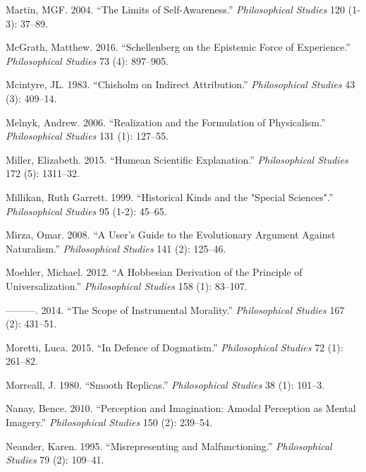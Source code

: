 \documentclass[
  10pt,
  letterpaper,
  DIV=11,
  numbers=noendperiod,
  twoside]{scrartcl}
\newlength{\cslhangindent}
\newenvironment{CSLReferences}[2] %
 {\begin{list}{}{%
  \setlength{\itemindent}{0pt}
  \setlength{\leftmargin}{0pt}
  \setlength{\parsep}{0pt}
  \ifodd #1
   \setlength{\leftmargin}{\cslhangindent}
   \setlength{\itemindent}{-1\cslhangindent}
  \fi
  \setlength{\itemsep}{#2\baselineskip}}}
 {\end{list}}
\begin{document}
\begin{CSLReferences}{1}{0}
Martin, MGF. 2004. {``The Limits of Self-Awareness.''}
\emph{Philosophical Studies} 120 (1-3): 37--89.

McGrath, Matthew. 2016. {``Schellenberg on the Epistemic Force of
Experience.''} \emph{Philosophical Studies} 73 (4): 897--905.

Mcintyre, JL. 1983. {``Chisholm on Indirect Attribution.''}
\emph{Philosophical Studies} 43 (3): 409--14.

Melnyk, Andrew. 2006. {``Realization and the Formulation of
Physicalism.''} \emph{Philosophical Studies} 131 (1): 127--55.

Miller, Elizabeth. 2015. {``Humean Scientific Explanation.''}
\emph{Philosophical Studies} 172 (5): 1311--32.

Millikan, Ruth Garrett. 1999. {``Historical Kinds and the "Special
Sciences".''} \emph{Philosophical Studies} 95 (1-2): 45--65.

Mirza, Omar. 2008. {``A User's Guide to the Evolutionary Argument
Against Naturalism.''} \emph{Philosophical Studies} 141 (2): 125--46.

Moehler, Michael. 2012. {``A Hobbesian Derivation of the Principle of
Universalization.''} \emph{Philosophical Studies} 158 (1): 83--107.

---------. 2014. {``The Scope of Instrumental Morality.''}
\emph{Philosophical Studies} 167 (2): 431--51.

Moretti, Luca. 2015. {``In Defence of Dogmatism.''} \emph{Philosophical
Studies} 72 (1): 261--82.

Morreall, J. 1980. {``Smooth Replicas.''} \emph{Philosophical Studies}
38 (1): 101--3.

Nanay, Bence. 2010. {``Perception and Imagination: Amodal Perception as
Mental Imagery.''} \emph{Philosophical Studies} 150 (2): 239--54.

Neander, Karen. 1995. {``Misrepresenting and Malfunctioning.''}
\emph{Philosophical Studies} 79 (2): 109--41.


\end{CSLReferences}
\end{document}
